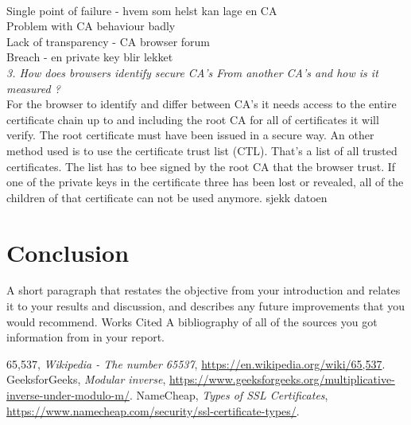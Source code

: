\documentclass[12pt, letterpaper]{article}
\begin{document}
\\
Single point of failure - hvem som helst kan lage en CA
\\
Problem with CA behaviour badly
\\
Lack of transparency - CA browser forum
\\
Breach - en private key blir lekket
\\
\textit{3. How does browsers identify secure CA's From another CA's and how is it measured ?}\\
For the browser to identify and differ between CA's it needs access to the entire certificate chain up to and including the root CA for all of certificates it will verify. The root certificate must have been issued in a secure way. An other method used is to use the certificate trust list (CTL). That's a list of all trusted certificates. The list has to bee signed by the root CA that the browser trust. If one of the private keys in the certificate three has been lost or revealed, all of the children of that certificate can not be used anymore. 
sjekk datoen


\section*{Conclusion}
A short paragraph that restates the objective from your introduction and relates it to your results and discussion, and
describes any future improvements that you would recommend. Works Cited A bibliography of all of the sources
you got information from in your report. 


\begin{thebibliography}{10} 
 65,537,  \emph{Wikipedia - The number 65537},
\url{https://en.wikipedia.org/wiki/65,537}.
 GeeksforGeeks,  \emph{Modular inverse},
\url{https://www.geeksforgeeks.org/multiplicative-inverse-under-modulo-m/}.
 NameCheap,  \emph{Types of SSL Certificates},
\url{https://www.namecheap.com/security/ssl-certificate-types/}.
\end{thebibliography}
\end{document}
